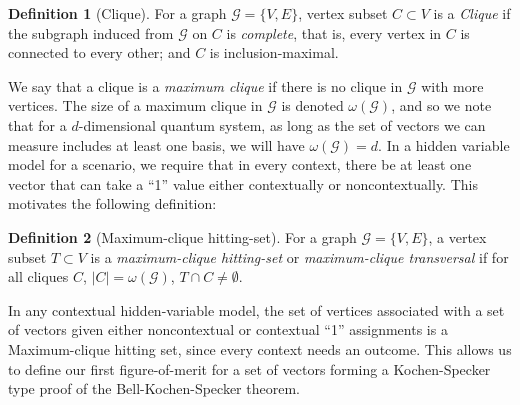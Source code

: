 \documentclass{amsart}
\theoremstyle{definition}
\newtheorem{defn}{Definition}
\begin{document}
\begin{defn}[Clique]
For a graph $\mathcal{G}=\{V,E\}$, vertex subset $C\subset V$ is a \emph{Clique} if the subgraph induced from $\mathcal{G}$ on $C$ is \emph{complete}, that is, every vertex in $C$ is connected to every other; and $C$ is inclusion-maximal.
\end{defn}

We say that a clique is a \emph{maximum clique} if there is no clique in $\mathcal{G}$ with more vertices. The size of a maximum clique in $\mathcal{G}$ is denoted $\omega(\mathcal{G})$, and so we note that for a $d$-dimensional quantum system, as long as the set of vectors we can measure includes at least one basis, we will have $\omega(\mathcal{G})=d$. In a hidden variable model for a scenario, we require that in every context, there be at least one vector that can take a ``1'' value either contextually or noncontextually. This motivates the following definition:



\begin{defn}[Maximum-clique hitting-set]
For a graph $\mathcal{G}=\{V,E\}$, a vertex subset $T\subset V$ is a \emph{maximum-clique hitting-set} or \emph{maximum-clique transversal} if for all cliques $C$, $|C|=\omega(\mathcal{G})$, $T\cap C\neq\emptyset$.
\end{defn}

In any contextual hidden-variable model, the set of vertices associated with a set of vectors given either noncontextual or contextual ``1'' assignments is a Maximum-clique hitting set, since every context needs an outcome. This allows us to define our first figure-of-merit for a set of vectors forming a Kochen-Specker type proof of the Bell-Kochen-Specker theorem.
\end{document}
